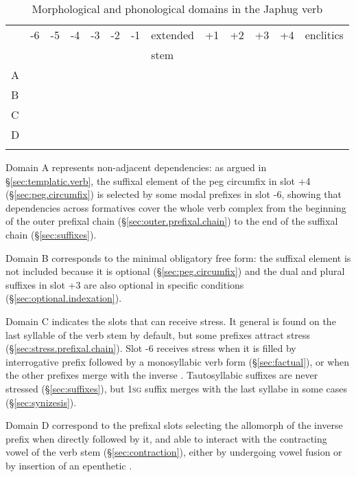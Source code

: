 \begin{table}
\caption{Morphological and phonological domains in the Japhug verb  }\label{tab:verbal.complex.domain}
\begin{tabular}{|l|llllll|l|llll|l|}
\lsptoprule
&-6 & -5 & -4 & -3 & -2 & -1 &   extended   & +1 & +2 & +3 & +4 & enclitics \\
&&&&&&&stem &&&&&\\
A&\multicolumn{11}{l}{\cellcolor{gray} }  & \\
B&\multicolumn{9}{l}{\cellcolor{gray} }  & \cellcolor{lightgray} && \\
C   &\multicolumn{7}{l}{\cellcolor{gray} } &\cellcolor{lightgray}&&&& \\ 
D  &\multicolumn{6}{l}{\cellcolor{gray} } &&&&&& \\
\lspbottomrule
\end{tabular}
\end{table}

Domain A represents non-adjacent dependencies: as argued in  §\ref{sec:templatic.verb}, the suffixal element  of the peg circumfix in slot +4 (§\ref{sec:peg.circumfix}) is selected by some modal prefixes in slot -6, showing that dependencies across formatives cover the whole verb complex from the beginning of the outer prefixal chain (§\ref{sec:outer.prefixal.chain}) to the end of the suffixal chain (§\ref{sec:suffixes}).  

Domain B corresponds to the minimal obligatory free form: the suffixal element  is not included because it is optional (§\ref{sec:peg.circumfix}) and the dual and plural suffixes in slot +3 are also optional in specific conditions (§\ref{sec:optional.indexation}).
 
 Domain C indicates the slots that can receive stress. It general is found on the last syllable of the verb stem by default, but some prefixes attract stress (§\ref{sec:stress.prefixal.chain}). Slot -6 receives stress when it is filled by interrogative prefix  followed by a monosyllabic verb form (§\ref{sec:factual}), or when the other prefixes merge with the inverse . Tautosyllabic suffixes are never stressed (§\ref{sec:suffixes}), but \textsc{1sg} suffix  merges with the last syllabe in some cases (§\ref{sec:synizesis}).

 Domain D correspond to the prefixal slots selecting the allomorph  of the inverse prefix when directly followed by it, and able to interact with the contracting vowel of the verb stem (§\ref{sec:contraction}), either by undergoing vowel fusion or by insertion of an epenthetic . 

